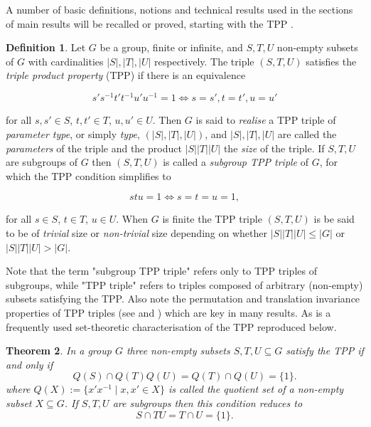 \documentclass{amsart}
\newtheorem{theorem}{Theorem}[section]
\theoremstyle{observation}
\theoremstyle{definition}
\newtheorem{definition}[theorem]{Definition}
\theoremstyle{remark}
\numberwithin{equation}{section}
\begin{document}
\vspace{1mm}

A number of basic definitions, notions and technical results used in the sections of main results will be recalled or proved, starting with the TPP \citep[Definition 2.1]{CU}.

\begin{definition}\label{TPP} Let $G$ be a group, finite or infinite, and $S, T, U$ non-empty subsets of $G$ with cardinalities $|S|, |T|, |U|$ respectively.  The triple $(S,T,U)$ satisfies the \emph{triple product property} (TPP) if there is an equivalence

\begin{equation}\label{TPPEqn} s's^{-1}t't^{-1}u'u^{-1} = 1 \iff s = s', t = t', u = u' \end{equation}

for all $s, s' \in S$, $t,t' \in T$, $u,u' \in U$. Then $G$ is said to \emph{realise} a TPP triple of \emph{parameter type}, or simply \emph{type}, $(|S|, |T|, |U|)$, and $|S|, |T|, |U|$ are called the \emph{parameters} of the triple and the product $|S||T||U|$ the \emph{size} of the triple.  If $S, T, U$ are subgroups of $G$ then $(S,T,U)$ is called a \emph{subgroup TPP triple} of $G$, for which the TPP condition simplifies to

\begin{equation} stu = 1 \iff s = t = u = 1, \end{equation}

for all $s \in S$, $t \in T$, $u \in U$. When $G$ is finite the TPP triple $(S, T, U)$ is be said to be of \emph{trivial} size or \emph{non-trivial} size depending on whether $|S||T||U| \leq |G|$ or $|S||T||U| > |G|$.
\end{definition}

Note that the term "subgroup TPP triple" refers only to TPP triples of subgroups, while "TPP triple" refers to triples composed of arbitrary (non-empty) subsets satisfying the TPP. Also note the permutation and translation invariance properties of TPP triples (see \citep[Lemma 2.1]{CU} and \citep[Observation 2.1]{Neu2011}) which are key in many results. As is a frequently used set-theoretic characterisation of the TPP reproduced below.

\begin{theorem} \label{HM} \textup{\citep[Theorem 3.1]{HM}} In a group $G$ three non-empty subsets $S,T,U \subseteq G$ satisfy the TPP if and only if 
\begin{equation}
\label{BasicTPPC2}Q(S) \cap Q(T)Q(U)  = Q(T) \cap Q(U) = \{1\}.
\end{equation}
where $Q(X) := \{x'x^{-1} \mathrel | x, x' \in X\}$ is called the quotient set of a non-empty subset $X\subseteq G$.  If $S, T, U$ are subgroups then this condition reduces to
\begin{equation}
\label{BasicTPPSub}S \cap TU  = T \cap U = \{1\}.
\end{equation}
\end{theorem}
\end{document}
